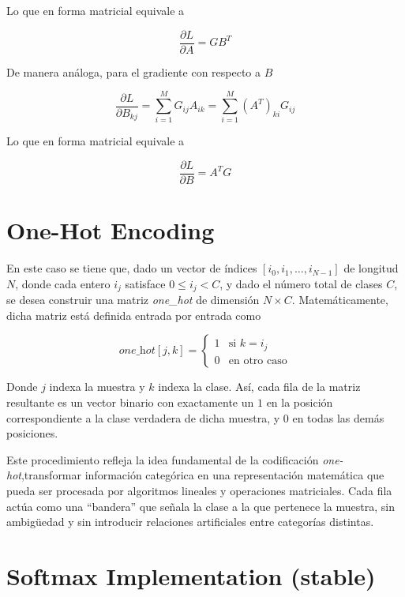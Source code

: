 \documentclass[12pt, letterpaper]{article}
\begin{document}
Lo que en forma matricial equivale a



\[
\frac{\partial L}{\partial A} = G B^T
\]



De manera análoga, para el gradiente con respecto a \(B\)



\[
\frac{\partial L}{\partial B_{kj}} = \sum_{i=1}^{M} G_{ij} A_{ik} = 
\sum_{i=1}^{M} (A^T)_{ki} G_{ij}
\]



Lo que en forma matricial equivale a



\[
\frac{\partial L}{\partial B} = A^T G
\]


\newpage

\section{One-Hot Encoding}
En este caso se tiene que, dado un vector de índices \([i_0, i_1, \ldots, i_{N-1}]\) de longitud \(N\), donde cada entero \(i_j\) satisface \(0 \leq i_j < C\), y dado el número total de clases \(C\), se desea construir una matriz \textit{one\_hot} de dimensión \(N \times C\). Matemáticamente, dicha matriz está definida entrada por entrada como

\[
\textit{one\_hot}[j, k] = 
\begin{cases} 
	1 & \text{si } k = i_j \\ 
	0 & \text{en otro caso} 
\end{cases}
\]



Donde \(j\) indexa la muestra y \(k\) indexa la clase. Así, cada fila de la matriz resultante es un vector binario con exactamente un \(1\) en la posición correspondiente a la clase verdadera de dicha muestra, y \(0\) en todas las demás posiciones.

Este procedimiento refleja la idea fundamental de la codificación \textit{one-hot},transformar información categórica en una representación matemática que pueda ser procesada por algoritmos lineales y operaciones matriciales. Cada fila actúa como una “bandera” que señala la clase a la que pertenece la muestra, sin ambigüedad y sin introducir relaciones artificiales entre categorías distintas. 

\newpage

\section{Softmax Implementation (stable)}
\end{document}
